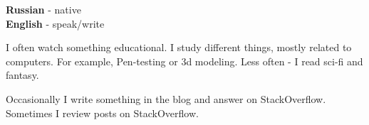 \begin{minipage}[t]{0.3\textwidth}
	\vspace{-\baselineskip} %


	\textbf{Russian} - native\\
	\textbf{English} - speak/write\\
\end{minipage}
\hfill
\begin{minipage}[t]{0.3\textwidth}
	\vspace{-\baselineskip} %


  I often watch something educational. I study different things, mostly related to computers. For example, Pen-testing or 3d modeling.
  Less often - I read sci-fi and fantasy.

\end{minipage}
\hfill
\begin{minipage}[t]{0.3\textwidth}
	\vspace{-\baselineskip} %


	Occasionally I write something in the blog and answer on StackOverflow. Sometimes I review posts on StackOverflow.
\end{minipage}




